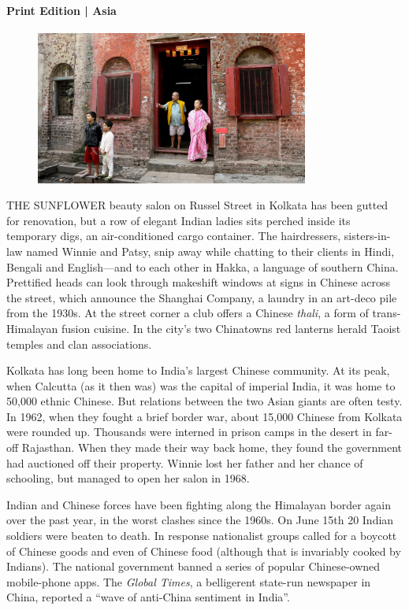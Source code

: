 \documentclass{article}
\begin{document}
\paragraph{Print Edition | Asia  \quad \color{gray}{Mar 25th 2021 }}
\begin{figure}[h]
\centering
\includegraphics[width=0.8\textwidth]{images/20210327_asp502.jpg}
\end{figure}
\lettrine{T}HE SUNFLOWER beauty salon on Russel Street in Kolkata has been gutted for renovation, but a row of elegant Indian ladies sits perched inside its temporary digs, an air-conditioned cargo container. The hairdressers, sisters-in-law named Winnie and Patsy, snip away while chatting to their clients in Hindi, Bengali and English---and to each other in Hakka, a language of southern China. Prettified heads can look through makeshift windows at signs in Chinese across the street, which announce the Shanghai Company, a laundry in an art-deco pile from the 1930s. At the street corner a club offers a Chinese \emph{thali}, a form of trans-Himalayan fusion cuisine. In the city's two Chinatowns red lanterns herald Taoist temples and clan associations. 

Kolkata has long been home to India's largest Chinese community. At its peak, when Calcutta (as it then was) was the capital of imperial India, it was home to 50,000 ethnic Chinese. But relations between the two Asian giants are often testy. In 1962, when they fought a brief border war, about 15,000 Chinese from Kolkata were rounded up. Thousands were interned in prison camps in the desert in far-off Rajasthan. When they made their way back home, they found the government had auctioned off their property. Winnie lost her father and her chance of schooling, but managed to open her salon in 1968. 

Indian and Chinese forces have been fighting along the Himalayan border again over the past year, in the worst clashes since the 1960s. On June 15th 20 Indian soldiers were beaten to death. In response nationalist groups called for a boycott of Chinese goods and even of Chinese food (although that is invariably cooked by Indians). The national government banned a series of popular Chinese-owned mobile-phone apps. The \emph{Global Times}, a belligerent state-run newspaper in China, reported a ``wave of anti-China sentiment in India''. 
\end{document}
